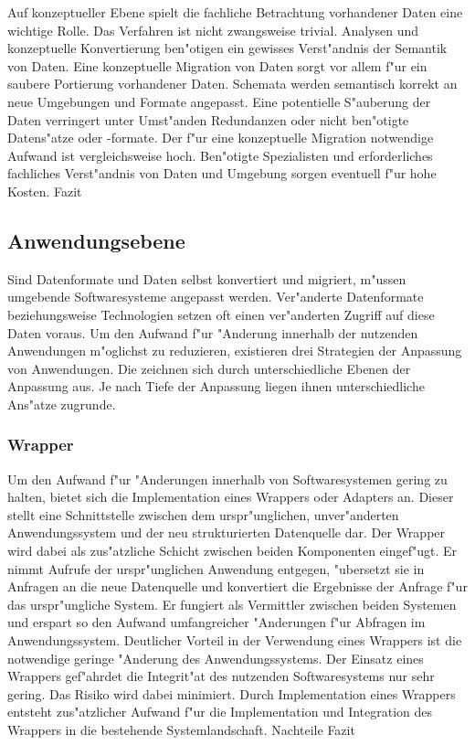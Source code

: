 Auf konzeptueller Ebene spielt die fachliche Betrachtung vorhandener Daten eine wichtige Rolle. Das Verfahren ist nicht zwangsweise trivial. Analysen und konzeptuelle Konvertierung ben"otigen ein gewisses Verst"andnis der Semantik von Daten.
\lb
Eine konzeptuelle Migration von Daten sorgt vor allem f"ur ein saubere Portierung vorhandener Daten. Schemata werden semantisch korrekt an neue Umgebungen und Formate angepasst. Eine potentielle S"auberung der Daten verringert unter Umst"anden Redundanzen oder nicht ben"otigte Datens"atze oder -formate.
\lb
Der f"ur eine konzeptuelle Migration notwendige Aufwand ist vergleichsweise hoch. Ben"otigte Spezialisten und erforderliches fachliches Verst"andnis von Daten und Umgebung sorgen eventuell f"ur hohe Kosten.
\lb
Fazit %

\subsection{Anwendungsebene} %

Sind Datenformate und Daten selbst konvertiert und migriert, m"ussen umgebende Softwaresysteme angepasst werden. Ver"anderte Datenformate beziehungsweise Technologien setzen oft einen ver"anderten Zugriff auf diese Daten voraus. Um den Aufwand f"ur "Anderung innerhalb der nutzenden Anwendungen m"oglichst zu reduzieren, existieren drei Strategien der Anpassung von Anwendungen. Die zeichnen sich durch unterschiedliche Ebenen der Anpassung aus. Je nach Tiefe der Anpassung liegen ihnen unterschiedliche Ans"atze zugrunde. 

\subsubsection{Wrapper}

Um den Aufwand f"ur "Anderungen innerhalb von Softwaresystemen gering zu halten, bietet sich die Implementation eines Wrappers oder Adapters an. Dieser stellt eine Schnittstelle zwischen dem urspr"unglichen, unver"anderten Anwendungssystem und der neu strukturierten Datenquelle dar. Der Wrapper wird dabei als zus"atzliche Schicht zwischen beiden Komponenten eingef"ugt. Er nimmt Aufrufe der urspr"unglichen Anwendung entgegen, "ubersetzt sie in Anfragen an die neue Datenquelle und konvertiert die Ergebnisse der Anfrage f"ur das urspr"ungliche System. Er fungiert als Vermittler zwischen beiden Systemen und erspart so den Aufwand umfangreicher "Anderungen f"ur Abfragen im Anwendungssystem.
\lb
Deutlicher Vorteil in der Verwendung eines Wrappers ist die notwendige geringe "Anderung des Anwendungssystems. Der Einsatz eines Wrappers gef"ahrdet die Integrit"at des nutzenden Softwaresystems nur sehr gering. Das Risiko wird dabei minimiert.
\lb
Durch Implementation eines Wrappers entsteht zus"atzlicher Aufwand f"ur die Implementation und Integration des Wrappers in die bestehende Systemlandschaft.
Nachteile
\lb
Fazit 
